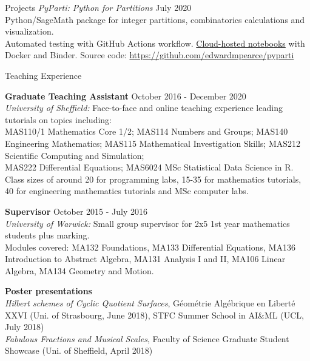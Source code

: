 \documentclass{resume} %
\begin{document}
\begin{rSection}{Projects}
{\em PyParti: Python for Partitions} \hfill July 2020 \\
Python/SageMath package for integer partitions, combinatorics calculations and visualization. \\
Automated testing with GitHub Actions workflow.
\href{https://mybinder.org/v2/gh/edwardmpearce/pyparti/master}{Cloud-hosted notebooks} with Docker and Binder.
Source code: \href{https://github.com/edwardmpearce/pyparti}{https://github.com/edwardmpearce/pyparti}

\end{rSection}


\begin{rSection}{Teaching Experience}

{\bf Graduate Teaching Assistant} \hfill October 2016 - December 2020 \\
{\em University of Sheffield:} Face-to-face and online teaching experience leading tutorials on topics including: \\
MAS110/1 Mathematics Core 1/2; MAS114 Numbers and Groups; MAS140 Engineering Mathematics; MAS115 Mathematical Investigation Skills; MAS212 Scientific Computing and Simulation; \\
MAS222 Differential Equations; MAS6024 MSc Statistical Data Science in R. \\
Class sizes of around 20 for programming labs, 15-35 for mathematics tutorials, \\40 for engineering mathematics tutorials and MSc computer labs.

{\bf Supervisor} \hfill October 2015 - July 2016 \\
{\em University of Warwick:} Small group supervisor for 2x5 1st year mathematics students plus marking. \\
Modules covered: MA132 Foundations, MA133 Differential Equations, MA136 Introduction to Abstract Algebra, MA131 Analysis I and II, MA106 Linear Algebra, MA134 Geometry and Motion.

{\bf Poster presentations} \\
{\em Hilbert schemes of Cyclic Quotient Surfaces},
Géométrie Algébrique en Liberté XXVI (Uni. of Strasbourg, June 2018), STFC Summer School in AI\&ML (UCL, July 2018) \\
{\em Fabulous Fractions and Musical Scales}, 
Faculty of Science Graduate Student Showcase (Uni. of Sheffield, April 2018)

\end{rSection}
\end{document}
